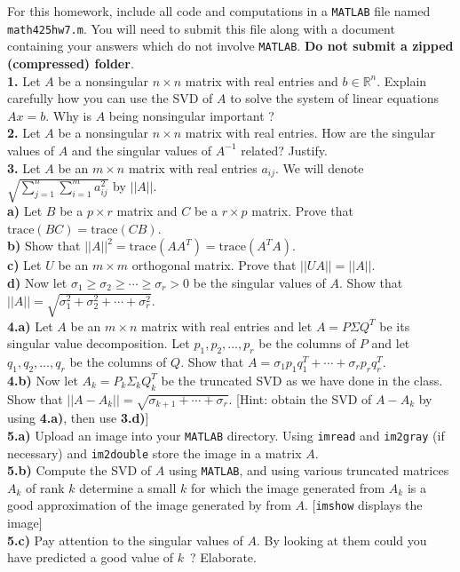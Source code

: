\documentclass[11pt]{amsart}
\theoremstyle{definition}  %
\begin{document}


\noindent For this homework, include all code and computations in a {\tt MATLAB} file named {\tt math425hw7.m}.
You will need to submit this file along with a document containing your answers which do not
involve {\tt MATLAB}. {\bf Do not submit a zipped (compressed) folder}. \\

\noindent
{\bf 1.} Let $A$ be a nonsingular $n \times n$ matrix with real entries and $b \in \mathbb{R}^n$. Explain carefully how you can use the SVD of $A$ to solve the system
of linear equations $Ax=b$. Why is $A$ being nonsingular important ? \\

\noindent
{\bf 2.}  Let $A$ be a nonsingular $n \times n$ matrix with real entries. How are the singular values of $A$ and the singular values of $A^{-1}$  related? Justify.\\


\noindent
{\bf 3.}  Let $A$ be an $m \times n$ matrix with real entries $a_{ij}$. We will denote $\sqrt{\sum_{j=1}^n \sum_{i=1}^m a_{ij}^2}$ by $||A||$. \\
{\bf a)} Let $B$ be a $p \times r$ matrix and $C$ be a $r \times p$ matrix. Prove that $\mathrm{trace}(BC) = \mathrm{trace}(CB)$. \\
{\bf b)} Show that $||A||^2 = \mathrm{trace}(AA^T) = \mathrm{trace}(A^TA)$. \\
{\bf c)} Let $U$ be an $m \times m$ orthogonal matrix. Prove that $||UA|| = ||A||$. \\
{\bf d)} Now let $\sigma_1 \geq \sigma_2 \geq \cdots \geq \sigma_r >0$ be the singular values of $A$. Show that $||A|| = \sqrt{\sigma_1^2 + \sigma_2^2 + \cdots + \sigma_r^2}$. \\

\noindent
{\bf 4.a)} Let $A$ be an $m \times n$ matrix with real entries and let $A = P\Sigma Q^T$ be its singular value decomposition. Let $p_1, p_2, \ldots, p_r$ be the columns of $P$
and let $q_1, q_2, \ldots, q_r$ be the columns of $Q$. Show that $ A = \sigma_1 p_1 q_1^T + \cdots + \sigma_r p_r q_r^T$. \\
{\bf 4.b)} Now let $A_k = P_k \Sigma_k Q_k^T$ be the truncated SVD as we have done in the class. Show that $||A - A_k|| = \sqrt{\sigma_{k+1} + \cdots + \sigma_{r}}$. [Hint: obtain
the SVD of $A - A_k$ by using {\bf 4.a)}, then use {\bf 3.d)}] \\

\noindent
{\bf 5.a)} Upload an image into your {\tt MATLAB} directory. Using {\tt imread} and {\tt im2gray} (if necessary) and {\tt im2double} store the image in a matrix $A$.\\
{\bf 5.b)} Compute the SVD of $A$ using {\tt MATLAB}, and using various truncated matrices $A_k$ of rank $k$ determine a small $k$ for which the image generated from $A_k$
is a good approximation of the image generated by from $A$. [{\tt imshow} displays the image] \\
{\bf 5.c)} Pay attention to the singular values of $A$. By looking at them could you have predicted a good value of $k$~? Elaborate. \\





 
\end{document}

